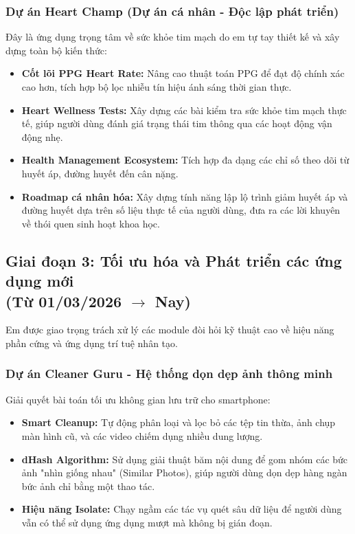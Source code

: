 \documentclass[12pt, a4paper]{article}
\begin{document}
\subsubsection{Dự án Heart Champ (Dự án cá nhân - Độc lập phát triển)}
Đây là ứng dụng trọng tâm về sức khỏe tim mạch do em tự tay thiết kế và xây dựng toàn bộ kiến thức:
\begin{itemize}
    \item \textbf{Cốt lõi PPG Heart Rate:} Nâng cao thuật toán PPG để đạt độ chính xác cao hơn, tích hợp bộ lọc nhiễu tín hiệu ánh sáng thời gian thực.
    \item \textbf{Heart Wellness Tests:} Xây dựng các bài kiểm tra sức khỏe tim mạch thực tế, giúp người dùng đánh giá trạng thái tim thông qua các hoạt động vận động nhẹ.
    \item \textbf{Health Management Ecosystem:} Tích hợp đa dạng các chỉ số theo dõi từ huyết áp, đường huyết đến cân nặng.
    \item \textbf{Roadmap cá nhân hóa:} Xây dựng tính năng lập lộ trình giảm huyết áp và đường huyết dựa trên số liệu thực tế của người dùng, đưa ra các lời khuyên về thói quen sinh hoạt khoa học.
\end{itemize}

\subsection[Giai đoạn 3: Tối ưu hóa và Phát triển các ứng dụng mới (Từ 01/03/2026 đến nay)]{Giai đoạn 3: Tối ưu hóa và Phát triển các ứng dụng mới \\(Từ 01/03/2026 $\rightarrow$ Nay)}
Em được giao trọng trách xử lý các module đòi hỏi kỹ thuật cao về hiệu năng phần cứng và ứng dụng trí tuệ nhân tạo.

\subsubsection{Dự án Cleaner Guru - Hệ thống dọn dẹp ảnh thông minh}
Giải quyết bài toán tối ưu không gian lưu trữ cho smartphone:
\begin{itemize}
    \item \textbf{Smart Cleanup:} Tự động phân loại và lọc bỏ các tệp tin thừa, ảnh chụp màn hình cũ, và các video chiếm dụng nhiều dung lượng.
    \item \textbf{dHash Algorithm:} Sử dụng giải thuật băm nội dung để gom nhóm các bức ảnh "nhìn giống nhau" (Similar Photos), giúp người dùng dọn dẹp hàng ngàn bức ảnh chỉ bằng một thao tác.
    \item \textbf{Hiệu năng Isolate:} Chạy ngầm các tác vụ quét sâu dữ liệu để người dùng vẫn có thể sử dụng ứng dụng mượt mà không bị gián đoạn.
\end{itemize}
\end{document}
